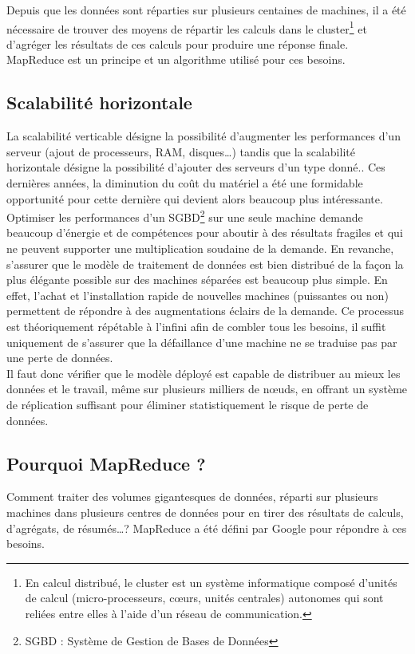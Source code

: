 Depuis que les données sont réparties sur plusieurs centaines de machines, il a été nécessaire de trouver des moyens de répartir les calculs dans le cluster\footnote{En calcul distribué, le cluster est un système informatique composé d'unités de calcul (micro-processeurs, cœurs, unités centrales) autonomes qui sont reliées entre elles à l'aide d'un réseau de communication.\cite{Wikipedia_cluster}} et d'agréger les résultats de ces calculs pour produire une réponse finale. MapReduce est un principe et un algorithme utilisé pour ces besoins.

\subsection{Scalabilité horizontale}
	La scalabilité verticable désigne la possibilité d'augmenter les performances d'un serveur (ajout de processeurs, RAM, disques\dots) tandis que la scalabilité horizontale désigne la possibilité d'ajouter des serveurs d'un type donné.\cite{Wikipedia_scalabilite}. Ces dernières années, la diminution du coût du matériel a été une formidable opportunité pour cette dernière qui devient alors beaucoup plus intéressante.\\

	Optimiser les performances d'un SGBD\footnote{SGBD : Système de Gestion de Bases de Données} sur une seule machine demande beaucoup d'énergie et de compétences pour aboutir à des résultats fragiles et qui ne peuvent supporter une multiplication soudaine de la demande. En revanche, s'assurer que le modèle de traitement de données est bien distribué de la façon la plus élégante possible sur des machines séparées est beaucoup plus simple. En effet, l'achat et l'installation rapide de nouvelles machines (puissantes ou non) permettent de répondre à des augmentations éclairs de la demande. Ce processus est théoriquement répétable à l'infini afin de combler tous les besoins, il suffit uniquement de s'assurer que la défaillance d'une machine ne se traduise pas par une perte de données.\\

	Il faut donc vérifier que le modèle déployé est capable de distribuer au mieux les données et le travail, même sur plusieurs milliers de nœuds, en offrant un système de réplication suffisant pour éliminer statistiquement le risque de perte de données.

\subsection{Pourquoi MapReduce ?}
	Comment traiter des volumes gigantesques de données, réparti sur plusieurs machines dans plusieurs centres de données pour en tirer des résultats de calculs, d'agrégats, de résumés\dots ? MapReduce a été défini par Google pour répondre à ces besoins.

